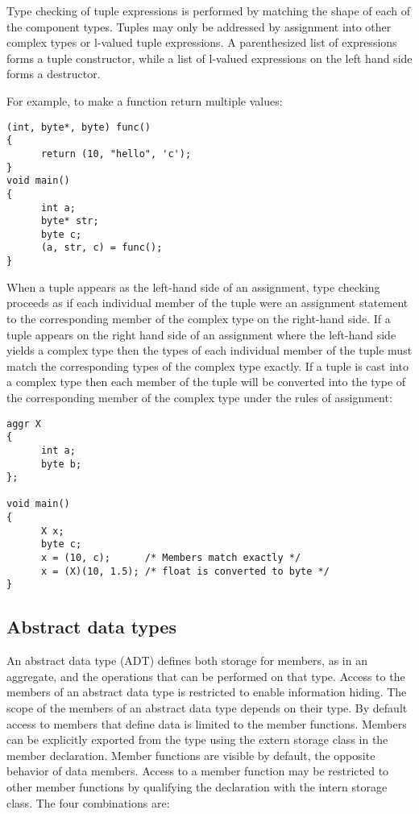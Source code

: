 Type checking of tuple expressions is performed by matching the shape of
each of the component types. Tuples may only be addressed by assignment
into other complex types or l-valued tuple expressions. A parenthesized
list of expressions forms a tuple constructor, while a list of l-valued
expressions on the left hand side forms a destructor.

For example, to make a function return multiple values:

\begin{lstlisting}
(int, byte*, byte) func()
{
      return (10, "hello", 'c');
}
void main()
{
      int a;
      byte* str;
      byte c;
      (a, str, c) = func();
}
\end{lstlisting}

When a tuple appears as the left-hand side of an assignment, type
checking proceeds as if each individual member of the tuple were an
assignment statement to the corresponding member of the complex type on
the right-hand side. If a tuple appears on the right hand side of an
assignment where the left-hand side yields a complex type then the types
of each individual member of the tuple must match the corresponding
types of the complex type exactly. If a tuple is cast into a complex
type then each member of the tuple will be converted into the type of
the corresponding member of the complex type under the rules of
assignment:

\begin{lstlisting}
aggr X
{
      int a;
      byte b;
};

void main()
{
      X x; 
      byte c;
      x = (10, c);      /* Members match exactly */
      x = (X)(10, 1.5); /* float is converted to byte */
}
\end{lstlisting}

\hypertarget{abstract-data-types}{%
\subsection{Abstract data types}\label{abstract-data-types}}

An abstract data type (ADT) defines both storage for members, as in an
aggregate, and the operations that can be performed on that type. Access
to the members of an abstract data type is restricted to enable
information hiding. The scope of the members of an abstract data type
depends on their type. By default access to members that define data is
limited to the member functions. Members can be explicitly exported from
the type using the extern storage class in the member declaration.
Member functions are visible by default, the opposite behavior of data
members. Access to a member function may be restricted to other member
functions by qualifying the declaration with the intern storage class.
The four combinations are:

